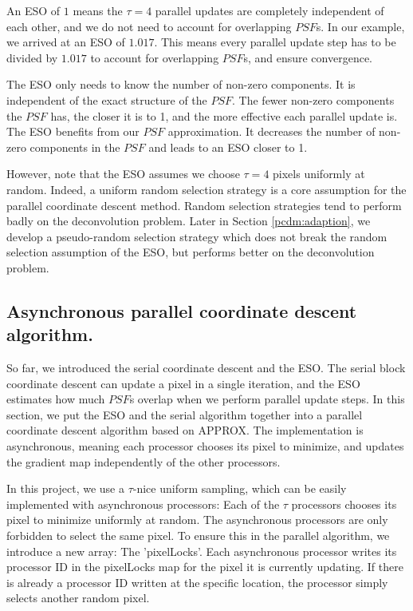 An ESO of $1$ means the $\tau = 4$ parallel updates are completely independent of each other, and we do not need to account for overlapping $PSF$s. In our example, we arrived at an ESO of $1.017$. This means every parallel update step has to be divided by $1.017$ to account for overlapping $PSF$s, and ensure convergence.

The ESO only needs to know the number of non-zero components. It is independent of the exact structure of the $PSF$. The fewer non-zero components the $PSF$ has, the closer it is to 1, and the more effective each parallel update is. The ESO benefits from our $PSF$ approximation. It decreases the number of non-zero components in the $PSF$ and leads to an ESO closer to 1.

However, note that the ESO assumes we choose $\tau = 4$ pixels uniformly at random. Indeed, a uniform random selection strategy is a core assumption for the parallel coordinate descent method\cite{richtarik2016parallel}. Random selection strategies tend to perform badly on the deconvolution problem. Later in Section \ref{pcdm:adaption}, we develop a pseudo-random selection strategy which does not break the random selection assumption of the ESO, but performs better on the deconvolution problem.


\subsection{Asynchronous parallel coordinate descent algorithm.}\label{pcdm:async}
So far, we introduced the serial coordinate descent and the ESO. The serial block coordinate descent can update a pixel in a single iteration, and the ESO estimates how much $PSF$s overlap when we perform parallel update steps. In this section, we put the ESO and the serial algorithm together into a parallel coordinate descent algorithm based on APPROX\cite{fercoq2015accelerated}. The implementation is asynchronous, meaning each processor chooses its pixel to minimize, and updates the gradient map independently of the other processors.

In this project, we use a $\tau$-nice uniform sampling, which can be easily implemented with asynchronous processors: Each of the $\tau$ processors chooses its pixel to minimize uniformly at random. The asynchronous processors are only forbidden to select the same pixel. To ensure this in the parallel algorithm, we introduce a new array: The 'pixelLocks'. Each asynchronous processor writes its processor ID in the pixelLocks map for the pixel it is currently updating. If there is already a processor ID written at the specific location, the processor simply selects another random pixel. 

